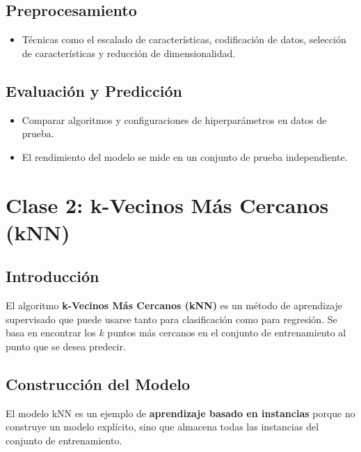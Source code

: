 \documentclass[a4paper, 11pt]{article}
\begin{document}
\subsection{Preprocesamiento}
\begin{itemize}
    \item Técnicas como el escalado de características, codificación de datos, selección de características y reducción de dimensionalidad.
\end{itemize}

\subsection{Evaluación y Predicción}
\begin{itemize}
    \item Comparar algoritmos y configuraciones de hiperparámetros en datos de prueba.
    \item El rendimiento del modelo se mide en un conjunto de prueba independiente.
\end{itemize}
\newpage
\section{Clase 2: k-Vecinos Más Cercanos (kNN)}

\subsection{Introducción}
El algoritmo \textbf{k-Vecinos Más Cercanos (kNN)} es un método de aprendizaje supervisado que puede usarse tanto para clasificación como para regresión. Se basa en encontrar los $k$ puntos más cercanos en el conjunto de entrenamiento al punto que se desea predecir.

\subsection{Construcción del Modelo}
El modelo kNN es un ejemplo de \textbf{aprendizaje basado en instancias} porque no construye un modelo explícito, sino que almacena todas las instancias del conjunto de entrenamiento.
\end{document}
